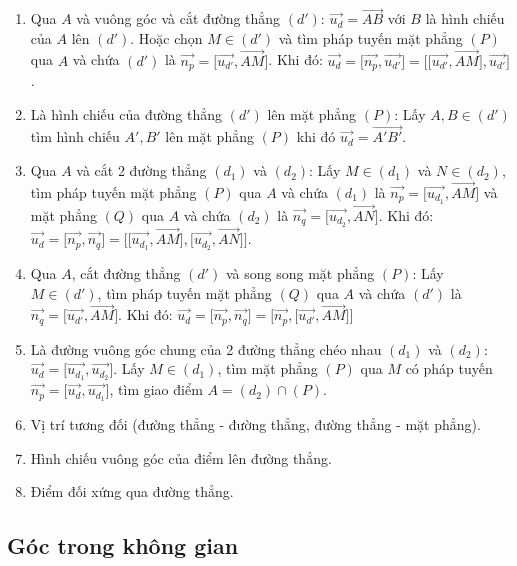 \documentclass[12pt,a4paper]{article}
\begin{document}
\begin{enumerate}[label=\textbf{Dạng \arabic*:}, leftmargin=*, align=left]
\begin{itemize}
  \end{itemize}
  \item Qua $A$ và vuông góc và cắt đường thẳng $(d')$: $\vec{u_d} = \overrightarrow{AB}$ với $B$ là hình chiếu của $A$ lên $(d')$. Hoặc chọn $M \in (d')$ và tìm pháp tuyến mặt phẳng $(P)$ qua $A$ và chứa $(d')$ là $\vec{n_p} = \bigl[\vec{u_{d'}}, \overrightarrow{AM}\bigr]$. Khi đó: $\vec{u_d} = \bigl[\vec{n_p}, \vec{u_{d'}}\bigr] = \bigl[\bigl[\vec{u_{d'}}, \overrightarrow{AM}\bigr], \vec{u_{d'}}\bigr]$.
  \item Là hình chiếu của đường thẳng $(d')$ lên mặt phẳng $(P)$: Lấy $A, B \in (d')$ tìm hình chiếu $A', B'$ lên mặt phẳng $(P)$ khi đó $\vec{u_d} = \overrightarrow{A'B'}$.
  \item Qua $A$ và cắt 2 đường thẳng $(d_1)$ và $(d_2)$: Lấy $M \in (d_1)$ và $N \in (d_2)$, tìm pháp tuyến mặt phẳng $(P)$ qua $A$ và chứa $(d_1)$ là $\vec{n_p} = \bigl[\vec{u_{d_1}}, \overrightarrow{AM}\bigr]$ và mặt phẳng $(Q)$ qua $A$ và chứa $(d_2)$ là $\vec{n_q} = \bigl[\vec{u_{d_2}}, \overrightarrow{AN}\bigr]$. Khi đó: $\vec{u_d} = \bigl[\vec{n_p}, \vec{n_q}\bigr] = \bigl[\bigl[\vec{u_{d_1}}, \overrightarrow{AM}\bigr], \bigl[\vec{u_{d_2}}, \overrightarrow{AN}\bigr]\bigr]$.
  \item Qua $A$, cắt đường thẳng $(d')$ và song song mặt phẳng $(P)$: Lấy $M \in (d')$, tìm pháp tuyến mặt phẳng $(Q)$ qua $A$ và chứa $(d')$ là $\vec{n_q} = \bigl[\vec{u_{d'}}, \overrightarrow{AM}\bigr]$. Khi đó: $\vec{u_d} = \bigl[\vec{n_p}, \vec{n_q}\bigr] = \bigl[\vec{n_p}, \bigl[\vec{u_{d'}}, \overrightarrow{AM}\bigr]\bigr]$
  \item Là đường vuông góc chung của 2 đường thẳng chéo nhau $(d_1)$ và $(d_2)$: $\vec{u_d} = \bigl[\vec{u_{d_1}}, \vec{u_{d_2}}\bigr]$. Lấy $M \in (d_1)$, tìm mặt phẳng $(P)$ qua $M$ có pháp tuyến $\vec{n_p} = \bigl[\vec{u_d}, \vec{u_{d_1}}\bigr]$, tìm giao điểm $A = (d_2) \cap (P)$.
  \item Vị trí tương đối (đường thẳng - đường thẳng, đường thẳng - mặt phẳng).
  \item Hình chiếu vuông góc của điểm lên đường thẳng.
  \item Điểm đối xứng qua đường thẳng.
\end{enumerate}

\subsection{Góc trong không gian}
\end{document}
